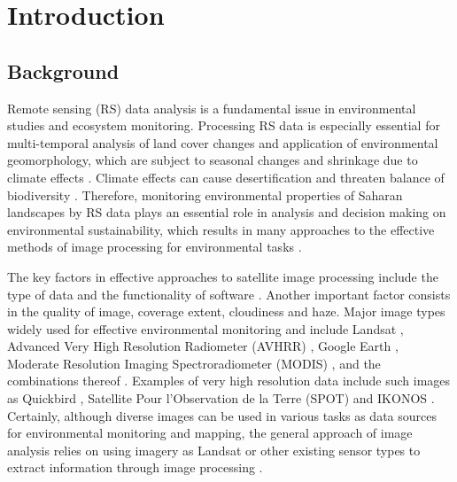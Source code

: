 \documentclass[environments,article,submit,pdftex,moreauthors]{Definitions/mdpi}
\begin{document}
\section{Introduction}

\subsection{Background}

Remote sensing (RS) data analysis is a fundamental issue in environmental studies and ecosystem monitoring. Processing RS data is especially essential for multi-temporal analysis of land cover changes \cite{BOUSSETTA2022102564} and application of environmental geomorphology, which are subject to seasonal changes and shrinkage due to climate effects \cite{JonesMillington}. Climate effects can cause desertification \cite{Pontanier,info14040249} and threaten balance of biodiversity \cite{YAICHEACHOUR2023501}. Therefore, monitoring environmental properties of Saharan landscapes by RS data plays an essential role in analysis and decision making on environmental sustainability, which results in many approaches to the effective methods of image processing for environmental tasks \cite{Monget,Lemenkova202227,CAMPOS2018211}. 

The key factors in effective approaches to satellite image processing include the type of data and the functionality of software \cite{rs14236017}. Another important factor consists in the quality of image, coverage extent, cloudiness and haze. Major image types widely used for effective environmental monitoring and include Landsat \cite{BOUSSEMA2023185,SMIDA2022104643,jmse11040871}, Advanced Very High Resolution Radiometer (AVHRR) \cite{Bryant}, Google Earth \cite{LI2022252}, Moderate Resolution Imaging Spectroradiometer (MODIS) \cite{TOUHAMI2022103804,RHIF2022101596}, and the combinations thereof \cite{REBILLARD1984133}. Examples of very high resolution data include such images as Quickbird \cite{CHOUARI2021443}, Satellite Pour l’Observation de la Terre (SPOT) and IKONOS \cite{VELA2008591}. Certainly, although diverse images can be used in various tasks as data sources for environmental monitoring and mapping, the general approach of image analysis relies on using imagery as Landsat or other existing sensor types to extract information through image processing \cite{LiangWang}. 
\end{document}
